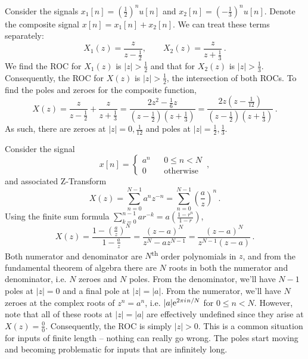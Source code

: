 \begin{exmp}
  Consider the signals $x_1[n] = \left(\frac{1}{2}\right)^nu[n]$ and
  $x_2[n] = \left(-\frac{1}{3}\right)^n u[n]$. Denote the composite signal
  $x[n] = x_1[n] + x_2[n]$. We can treat these terms separately:
  \begin{displaymath}
    X_1(z) = \frac{z}{z - \frac{1}{2}}, \qquad X_2(z) = \frac{z}{z + \frac{1}{3}} \,.
  \end{displaymath}
  We find the ROC for $X_1(z)$ is $|z|>\frac{1}{2}$ and that for $X_2(z)$ is
  $|z| > \frac{1}{3}$. Consequently, the ROC for $X(z)$ is $|z| > \frac{1}{2}$,
  the intersection of both ROCs. To find the poles and zeroes for the composite
  function,
  \begin{displaymath}
    X(z) = \frac{z}{z - \frac{1}{2}} + \frac{z}{z + \frac{1}{3}}
    = \frac{2z^2 - \frac{1}{6}z}{(z-\frac{1}{2})(z+\frac{1}{3})}
    = \frac{2z(z-\frac{1}{12})}{(z-\frac{1}{2})(z+\frac{1}{3})} \,.
  \end{displaymath}
  As such, there are zeroes at $|z|=0,\frac{1}{12}$ and poles at
  $|z|=\frac{1}{2},\frac{1}{3}$.
\end{exmp}
%
\begin{exmp}
  Consider the signal
  \begin{displaymath}
    x[n] = \left\{\begin{array}{ccl}
    a^n & & 0 \leq n < N \\
    0 & & \mathrm{otherwise}
    \end{array}\right. \,,
  \end{displaymath}
  and associated Z-Transform
  \begin{displaymath}
    X(z) = \sum_{n=0}^{N-1}a^n z^{-n} = \sum_{n=0}^{N-1}\left(\frac{a}{z}\right)^n \,.
  \end{displaymath}
  Using the finite sum formula $\sum_{k=0}^{n-1}ar^{-k} = a\left(\frac{1-r^n}{1 - r}\right)$,
  \begin{displaymath}
    X(z) = \frac{1 - \left(\frac{a}{z}\right)^N}{1 - \frac{a}{z}} = \frac{(z-a)^N}{z^N - az^{N-1}}
    = \frac{(z-a)^N}{z^{N-1}(z-a)} \,.
  \end{displaymath}
  Both numerator and denominator are $N$\textsuperscript{th} order polynomials in
  $z$, and from the fundamental theorem of algebra there are $N$ roots in
  both the numerator and denominator, i.e. $N$ zeroes and $N$ poles. From the
  denominator, we'll have $N-1$ poles at $|z|=0$ and a final pole at $|z|=|a|$.
  From the numerator, we'll have $N$ zeroes at the complex roots of $z^n = a^n$,
  i.e. $|a|\mathrm{e}^{2\pi {i\mkern1mu} n / N}$ for $0\leq n < N$. However, note that all of
  these roots at $|z| = |a|$ are effectively undefined since they arise at
  $X(z) = \frac{0}{0}$. Consequently, the ROC is simply $|z| > 0$. This is a
  common situation for inputs of finite length -- nothing can really go wrong.
  The poles start moving and becoming problematic for inputs that are
  infinitely long.
\end{exmp}
